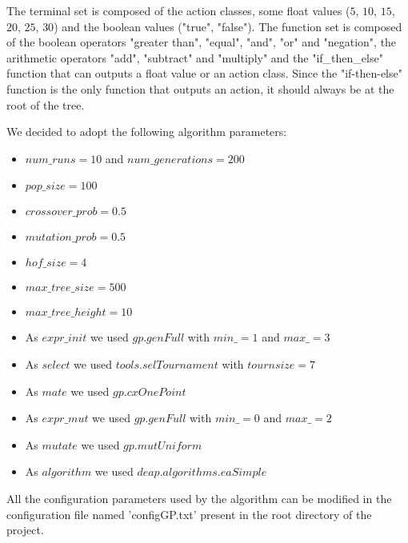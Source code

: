 The terminal set is composed of the action classes, some float values ($5$, $10$, $15$, $20$, $25$, $30$)
and the boolean values ("true", "false"). The function set is composed of the
boolean operators "greater than", "equal", "and", "or" and "negation", the arithmetic operators
"add", "subtract" and "multiply" and the "if\_then\_else" function that can outputs a float value or
an action class. Since the "if-then-else" function is the only function that outputs an action, it
should always be at the root of the tree.

We decided to adopt the following algorithm parameters:
\begin{itemize}
    \item $num\_runs = 10$ and $num\_generations = 200$
    \item $pop\_size = 100$
    \item $crossover\_prob = 0.5$
    \item $mutation\_prob = 0.5$
    \item $hof\_size = 4$
    \item $max\_tree\_size = 500$
    \item $max\_tree\_height = 10$
    \item As $expr\_init$ we used $gp.genFull$ with $min\_ = 1$ and $max\_ = 3$
    \item As $select$ we used $tools.selTournament$ with $tournsize = 7$
    \item As $mate$ we used $gp.cxOnePoint$
    \item As $expr\_mut$ we used $gp.genFull$ with $min\_ = 0$ and $max\_ = 2$
    \item As $mutate$ we used $gp.mutUniform$
    \item As $algorithm$ we used $deap.algorithms.eaSimple$
\end{itemize}

All the configuration parameters used by the algorithm can be modified in the configuration
file named 'configGP.txt' present in the root directory of the project.
